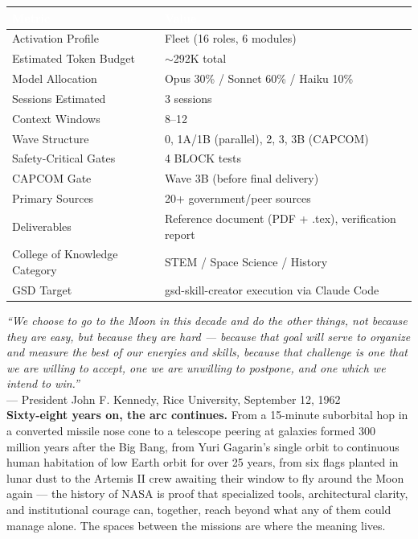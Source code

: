 \documentclass[11pt,letterpaper]{article}
\newcommand{\tableheader}[1]{\textbf{\sffamily\textcolor{white}{#1}}}
\begin{document}
\begin{center}
\begin{tabularx}{\textwidth}{L{5cm}X}
\toprule
{}
\tableheader{Metric} & \tableheader{Value} \\
\midrule
Activation Profile & Fleet (16 roles, 6 modules) \\
Estimated Token Budget & $\sim$292K total \\
Model Allocation & Opus 30\% / Sonnet 60\% / Haiku 10\% \\
Sessions Estimated & 3 sessions \\
Context Windows & 8--12 \\
Wave Structure & 0, 1A/1B (parallel), 2, 3, 3B (CAPCOM) \\
Safety-Critical Gates & 4 BLOCK tests \\
CAPCOM Gate & Wave 3B (before final delivery) \\
Primary Sources & 20+ government/peer sources \\
Deliverables & Reference document (PDF + .tex), verification report \\
College of Knowledge Category & STEM / Space Science / History \\
GSD Target & gsd-skill-creator execution via Claude Code \\
\bottomrule
\end{tabularx}
\end{center}

\vspace{2em}

\begin{quotebox}
\textit{``We choose to go to the Moon in this decade and do the other things, not because they are easy, but because they are hard --- because that goal will serve to organize and measure the best of our energies and skills, because that challenge is one that we are willing to accept, one we are unwilling to postpone, and one which we intend to win.''}\\[0.5em]
--- President John F. Kennedy, Rice University, September 12, 1962\\[1em]
\textbf{Sixty-eight years on, the arc continues.} From a 15-minute suborbital hop in a converted missile nose cone to a telescope peering at galaxies formed 300 million years after the Big Bang, from Yuri Gagarin's single orbit to continuous human habitation of low Earth orbit for over 25 years, from six flags planted in lunar dust to the Artemis II crew awaiting their window to fly around the Moon again --- the history of NASA is proof that specialized tools, architectural clarity, and institutional courage can, together, reach beyond what any of them could manage alone. The spaces between the missions are where the meaning lives.
\end{quotebox}
\end{document}
